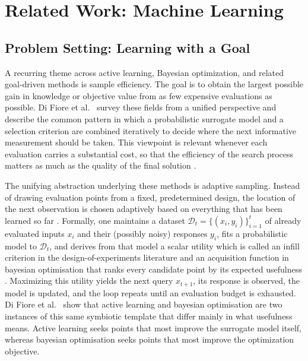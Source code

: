 \documentclass[12pt,a4paper]{report}
\begin{document}
        \section{Related Work: Machine Learning}

        \subsection{Problem Setting: Learning with a Goal}
        A recurring theme across active learning, Bayesian optimization, and related goal-driven methods is sample efficiency. The goal is to obtain the largest possible gain in knowledge or objective value from as few expensive evaluations as possible. Di Fiore et al.~\cite{di2024active} survey these fields from a unified perspective and describe the common pattern in which a probabilistic surrogate model and a selection criterion are combined iteratively to decide where the next informative measurement should be taken. This viewpoint is relevant whenever each evaluation carries a substantial cost, so that the efficiency of the search process matters as much as the quality of the final solution \cite{di2024active}.

        The unifying abstraction underlying these methods is adaptive sampling. Instead of drawing evaluation points from a fixed, predetermined design, the location of the next observation is chosen adaptively based on everything that has been learned so far \cite{di2024active}. Formally, one maintains a dataset $\mathcal{D}_t = \{(x_i, y_i)\}_{i=1}^{t}$ of already evaluated inputs $x_i$ and their (possibly noisy) responses $y_i$, fits a probabilistic model to $\mathcal{D}_t$, and derives from that model a scalar utility which is called an infill criterion in the design-of-experiments literature and an acquisition function in bayesian optimisation that ranks every candidate point by its expected usefulness \cite{di2024active}. Maximizing this utility yields the next query $x_{t+1}$, its response is observed, the model is updated, and the loop repeats until an evaluation budget is exhausted. Di Fiore et al.~\cite{di2024active} show that active learning and bayesian optimisation are two instances of this same symbiotic template that differ mainly in what usefulness means. Active learning seeks points that most improve the surrogate model itself, whereas bayesian optimisation seeks points that most improve the optimization objective.
\end{document}
